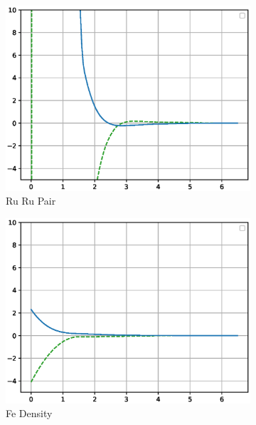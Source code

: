 \begin{figure}[htb]
\begin{subfigure}{.32\textwidth}
  \includegraphics[width=.94\linewidth]{chapters/potentials_fe_pd_ru/feru_potential/function_plots/ruru_pair.eps}  
  \caption{Ru Ru Pair}
  \label{fig:feru-ruru-pair}
\end{subfigure}
\begin{subfigure}{.32\textwidth}
  \centering
  \includegraphics[width=.94\linewidth]{chapters/potentials_fe_pd_ru/feru_potential/function_plots/fe_dens.eps}  
  \caption{Fe Density}
  \label{fig:feru-fe-dens}
\end{subfigure}
\begin{subfigure}{.32\textwidth}
  \centering

\end{subfigure}
\end{figure}
